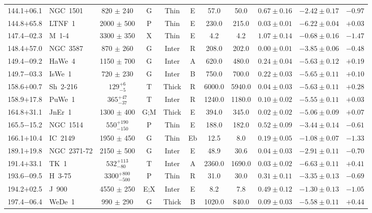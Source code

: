 \documentclass[useAMS]{mn2e}
\begin{document}
\begin{center}
{\begin{longtable}{llccccccccc}
144.1$+$06.1		&	NGC~1501	&	820	$\pm$	240	&	G		&	Thin		&	E		&	57.0		&	50.0		&	$0.67 \pm 0.16$		&	$-2.42 \pm 0.17$		&	$-0.97$	\\
144.8$+$65.8		&	LTNF~1	&	2000	$\pm$	500	&	P		&	Thin		&	E		&	230.0		&	215.0		&	$0.03 \pm 0.01$		&	$-6.22 \pm 0.04$		&	$+0.03$	\\
147.4$-$02.3		&	M~1-4	&	3300	$\pm$	350	&	X		&	Thin		&	E		&	4.2		&	4.2		&	$1.07 \pm 0.14$		&	$-0.68 \pm 0.16$		&	$-1.47$	\\
148.4$+$57.0		&	NGC~3587	&	870	$\pm$	260	&	G		&	Inter		&	R		&	208.0		&	202.0		&	$0.00 \pm 0.01$		&	$-3.85 \pm 0.06$		&	$-0.48$	\\
149.4$-$09.2		&	HaWe~4	&	1150	$\pm$	700	&	G		&	Inter		&	A		&	620.0		&	480.0		&	$0.24 \pm 0.04$		&	$-5.63 \pm 0.12$		&	$+0.19$	\\
149.7$-$03.3		&	IsWe~1	&	720	$\pm$	230	&	G		&	Inter		&	B		&	750.0		&	700.0		&	$0.22 \pm 0.03$		&	$-5.65 \pm 0.11$		&	$+0.10$	\\
158.6$+$00.7		&	Sh~2-216	&	$129^{+6}_{-5}$		&	T		&	Thick		&	R		&	6000.0		&	5940.0		&	$0.04 \pm 0.03$		&	$-5.63 \pm 0.11$		&	$+0.28$	\\
158.9$+$17.8		&	PuWe~1	&	$365^{+47}_{-37}$		&	T		&	Inter		&	R		&	1240.0		&	1180.0		&	$0.10 \pm 0.02$		&	$-5.55 \pm 0.11$		&	$+0.03$	\\
164.8$+$31.1		&	JnEr~1	&	1300	$\pm$	400	&	G;M		&	Thick		&	E		&	394.0		&	345.0		&	$0.02 \pm 0.02$		&	$-5.06 \pm 0.09$		&	$+0.07$	\\
165.5$-$15.2		&	NGC~1514	&	$550^{+190}_{-150}$		&	P		&	Thin		&	E		&	188.0		&	182.0		&	$0.52 \pm 0.09$		&	$-3.44 \pm 0.14$		&	$-0.61$	\\
166.1$+$10.4		&	IC~2149	&	1950	$\pm$	450	&	G		&	Thin		&	Eb		&	12.5		&	8.0		&	$0.19 \pm 0.05$		&	$-1.08 \pm 0.07$		&	$-1.33$	\\
189.1$+$19.8		&	NGC~2371-72	&	2150	$\pm$	500	&	G		&	Inter		&	E		&	48.9		&	30.6		&	$0.04 \pm 0.03$		&	$-2.91 \pm 0.11$		&	$-0.70$	\\
191.4$+$33.1		&	TK~1	&	$532^{+113}_{-80}$		&	T		&	Inter		&	A		&	2360.0		&	1690.0		&	$0.03 \pm 0.02$		&	$-6.63 \pm 0.11$		&	$+0.41$	\\
193.6$-$09.5		&	H~3-75	&	$3300^{+800}_{-500}$		&	P		&	Thin		&	R		&	31.0		&	30.0		&	$0.31 \pm 0.11$		&	$-3.35 \pm 0.13$		&	$-0.69$	\\
194.2$+$02.5		&	J~900	&	4550	$\pm$	250	&	E;X		&	Inter		&	E		&	8.2		&	7.8		&	$0.49 \pm 0.12$		&	$-1.30 \pm 0.13$		&	$-1.05$	\\
197.4$-$06.4		&	WeDe~1	&	990	$\pm$	290	&	G		&	Thick		&	B		&	1020.0		&	840.0		&	$0.09 \pm 0.03$		&	$-5.58 \pm 0.11$		&	$+0.44$	\\

\end{longtable}}
\end{center}
\end{document}

